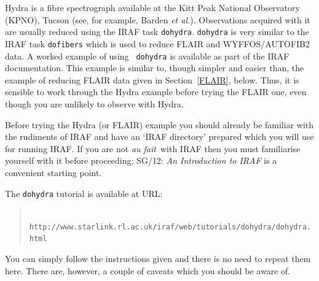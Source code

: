 \documentclass[twoside,11pt]{article}
\newcommand{\htmladdnormallink}[2]{#1}
\newcommand{\xref}[3]{#1}
\begin{document}
Hydra is a fibre spectrograph available at the Kitt Peak National
Observatory (KPNO), Tucson (see, for example, Barden {\it et
al.}\/\cite{BARDEN93}).  Observations acquired with it are usually
reduced using the IRAF task {\tt dohydra}.  {\tt dohydra} is very
similar to the IRAF task {\tt dofibers} which is used to reduce
FLAIR and WYFFOS/AUTOFIB2 data.  A worked example of using {\tt
dohydra} is available as part of the IRAF documentation.  This example
is similar to, though simpler and easier than, the example of reducing
FLAIR data given in Section~\ref{FLAIR}, below.  Thus, it is sensible to
work through the Hydra example before trying the FLAIR one, even though
you are unlikely to observe with Hydra.

Before trying the Hydra (or FLAIR) example you should already be familiar
with the rudiments of IRAF and have an `IRAF directory' prepared which
you will use for running IRAF.  If you are not {\it au fait}\, with
IRAF then you must familiarise yourself with it before proceeding;
\xref{SG/12: {\it An Introduction to IRAF}}{sg12}{}\/\cite{SG12}
is a convenient starting point.

The {\tt dohydra} tutorial is available at URL:

\begin{quote}
\htmladdnormallink{ {\tt
http://www.starlink.rl.ac.uk/iraf/web/tutorials/dohydra/dohydra.html}}
{http://www.starlink.rl.ac.uk/iraf/web/tutorials/dohydra/dohydra.html}
\end{quote}

You can simply follow the instructions given and there is no need to
repeat them here.  There are, however, a couple of caveats which
you should be aware of.
\end{document}

